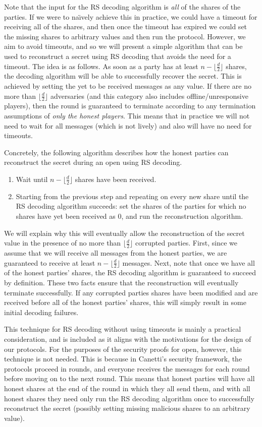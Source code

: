 \documentclass{article}
\theoremstyle{remark}
\begin{document}
Note that the input for the RS decoding algorithm is \textit{all} of the shares
of the parties. If we were to na\"\i{}vely achieve this in practice, we could
have a timeout for receiving all of the shares, and then once the timeout has
expired we could set the missing shares to arbitrary values and then run the
protocol. However, we aim to avoid timeouts, and so we will present a simple
algorithm that can be used to reconstruct a secret using RS decoding that
avoids the need for a timeout. The idea is as follows. As soon as a party has
at least $n - \lfloor \frac{d}{2} \rfloor$ shares, the decoding algorithm will
be able to successfully recover the secret. This is achieved by setting the yet
to be received messages as any value. If there are no more than $\lfloor
\frac{d}{2} \rfloor$ adversaries (and this category also includes
offline/unresponsive players), then the round is guaranteed to terminate
according to any termination assumptions of \textit{only the honest players}.
This means that in practice we will not need to wait for all messages (which is
not lively) and also will have no need for timeouts.

Concretely, the following algorithm describes how the honest parties can
reconstruct the secret during an open using RS decoding.
\begin{enumerate}
	\item Wait until $n - \lfloor \frac{d}{2} \rfloor$ shares have been
		received.
	\item Starting from the previous step and repeating on every new share
		until the RS decoding algorithm succeeds: set the shares of the parties
		for which no shares have yet been received as $0$, and run the
		reconstruction algorithm.
\end{enumerate}
We will explain why this will eventually allow the reconstruction of the secret
value in the presence of no more than $\lfloor \frac{d}{2} \rfloor$ corrupted
parties. First, since we assume that we will receive all messages from the
honest parties, we are guaranteed to receive at least $n - \lfloor \frac{d}{2}
\rfloor$ messages. Next, note that once we have all of the honest parties'
shares, the RS decoding algorithm is guaranteed to succeed by definition. These
two facts ensure that the reconstruction will eventually terminate
successfully. If any corrupted parties shares have been modified and are
received before all of the honest parties' shares, this will simply result in
some initial decoding failures.

This technique for RS decoding without using timeouts is mainly a practical
consideration, and is included as it aligns with the motivations for the design
of our protocols. For the purposes of the security proofs for open, however,
this technique is not needed. This is because in Canetti's security framework,
the protocols proceed in rounds, and everyone receives the messages for each
round before moving on to the next round. This means that honest parties will
have all honest shares at the end of the round in which they all send them, and
with all honest shares they need only run the RS decoding algorithm once to
successfully reconstruct the secret (possibly setting missing malicious shares
to an arbitrary value).
\end{document}

